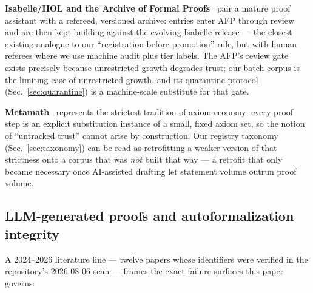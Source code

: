 \textbf{Isabelle/HOL and the Archive of Formal
Proofs}~\cite{isabelle} pair a mature proof assistant with a
refereed, versioned archive: entries enter AFP through review and
are then kept building against the evolving Isabelle release ---
the closest existing analogue to our ``registration before
promotion'' rule, but with human referees where we use machine
audit plus tier labels. The AFP's review gate exists precisely
because unrestricted growth degrades trust; our batch corpus is the
limiting case of unrestricted growth, and its quarantine protocol
(Sec.~\ref{sec:quarantine}) is a machine-scale substitute for that
gate.

\textbf{Metamath}~\cite{metamath} represents the strictest tradition
of axiom economy: every proof step is an explicit substitution
instance of a small, fixed axiom set, so the notion of
``untracked trust'' cannot arise by construction. Our registry
taxonomy (Sec.~\ref{sec:taxonomy}) can be read as retrofitting a
weaker version of that strictness onto a corpus that was \emph{not}
built that way --- a retrofit that only became necessary once
AI-assisted drafting let statement volume outrun proof volume.

\subsection{LLM-generated proofs and autoformalization integrity}
\label{sec:related-llm}
A 2024--2026 literature line --- twelve papers whose identifiers
were verified in the repository's 2026-08-06 scan
\cite{leancopilot2024,forml4,leanworkbook,userintent2024,wild2025,
commonframework2025,masa2025,rlmeval2025,llmoutput2025,leanatlas2026,
paraphrase2026,robustness2026} --- frames
the exact failure surfaces this paper governs:

